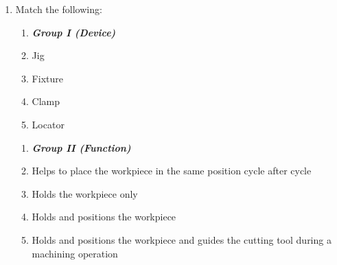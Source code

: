 \documentclass[journal,12pt,onecolumn]{IEEEtran}
\theoremstyle{remark}
\begin{document}
\begin{enumerate}
\begin{multicols}{2}
\begin{enumerate}
    \item P-2, Q-1, R-4, S-3
    \item P-1, Q-2, R-3, S-4
    \item P-1, Q-4, R-2, S-3
    \item P-2, Q-4, R-1, S-3
\end{enumerate}
\end{multicols}
\hfill (GATE PI 2009)
\noindent 
\item Match the following:
{
\setlength{\columnsep}{-8cm}
\begin{multicols}{2}
\begin{enumerate}[label=\Alph*.]
    \item[]  \textit{\textbf{Group I (Device)}}
    \item Jig
    \item Fixture
    \item Clamp
    \item Locator
\end{enumerate}
\columnbreak
\begin{enumerate}[label=\arabic*.]
    \item[] \textit{\textbf{Group II (Function)}}
    \item Helps to place the workpiece in the same position cycle after cycle
    \item Holds the workpiece only
    \item Holds and positions the workpiece
    \item Holds and positions the workpiece and guides the cutting tool during a machining operation
\end{enumerate}
\end{multicols}
}


\end{enumerate}
\end{document}
